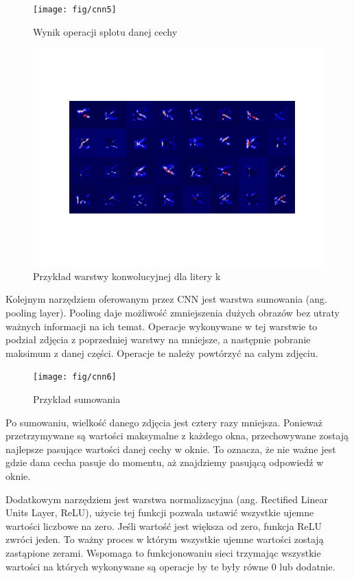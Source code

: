 \documentclass[brudnopis]{xmgr}
\begin{document}
\begin{figure}[!tbh]
\centering
\texttt{[image: fig/cnn5]}
\caption{Wynik operacji splotu danej cechy}
\end{figure}

\begin{figure}[!tbh]
\centering
\includegraphics[width=.8\hsize]{fig/figure_1}
\caption{Przykład warstwy konwolucyjnej dla litery k}
\end{figure}
\newpage

Kolejnym narzędziem oferowanym przez CNN jest warstwa sumowania (ang. pooling layer). Pooling daje możliwość zmniejszenia dużych obrazów bez utraty ważnych informacji na ich temat. Operacje wykonywane w tej warstwie to podział zdjęcia z poprzedniej warstwy na mniejsze, a następnie pobranie maksimum z danej części. Operacje te należy powtórzyć na całym zdjęciu.


\begin{figure}[!tbh]
\centering
\texttt{[image: fig/cnn6]}
\caption{Przykład sumowania}
\end{figure}

Po sumowaniu, wielkość danego zdjęcia jest cztery razy mniejsza. Ponieważ przetrzymywane są wartości maksymalne z każdego okna, przechowywane zostają najlepsze pasujące wartości danej cechy w oknie. To oznacza, że nie ważne jest gdzie dana cecha pasuje do momentu, aż znajdziemy pasującą odpowiedź w oknie.

Dodatkowym narzędziem jest warstwa normalizacyjna (ang. Rectified Linear Units Layer, ReLU), użycie tej funkcji pozwala ustawić wszystkie ujemne wartości liczbowe na zero. Jeśli wartość jest większa od zero, funkcja ReLU zwróci jeden. To ważny proces w którym wszystkie ujemne wartości zostają zastąpione zerami. Wspomaga to funkcjonowaniu sieci trzymając wszystkie wartości na których wykonywane są operacje by te były równe 0 lub dodatnie.
\end{document}
